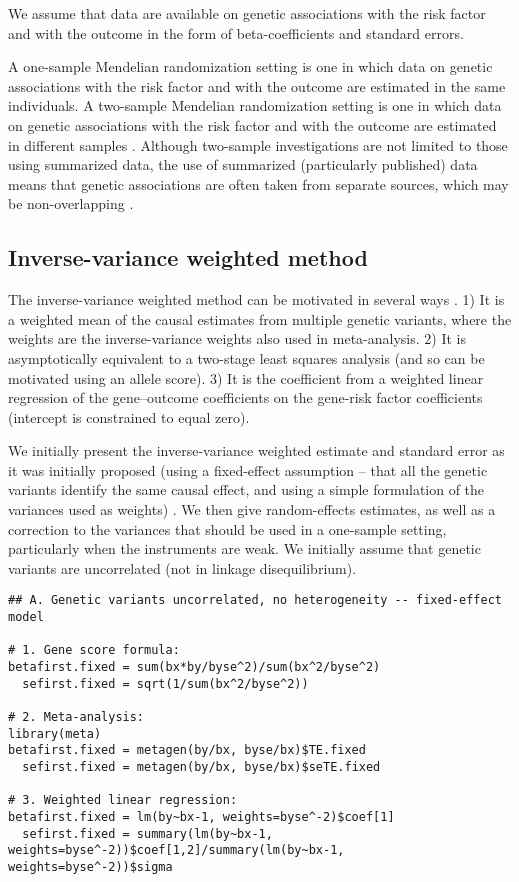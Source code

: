 \documentclass[a4paper,12pt]{article} %
\begin{document}
We assume that data are available on genetic associations with the risk factor and with the outcome in the form of beta-coefficients and standard errors.

A one-sample Mendelian randomization setting is one in which data on genetic associations with the risk factor and with the outcome are estimated in the same individuals. A two-sample Mendelian randomization setting is one in which data on genetic associations with the risk factor and with the outcome are estimated in different samples \citep{pierce2013}. Although two-sample investigations are not limited to those using summarized data, the use of summarized (particularly published) data means that genetic associations are often taken from separate sources, which may be non-overlapping \citep{burgess2014twosample}.

\clearpage

\subsection{Inverse-variance weighted method}
The inverse-variance weighted method can be motivated in several ways \citep{burgess2013genepi}. 1) It is a weighted mean of the causal estimates from multiple genetic variants, where the weights are the inverse-variance weights also used in meta-analysis. 2) It is asymptotically equivalent to a two-stage least squares analysis (and so can be motivated using an allele score). 3) It is the coefficient from a weighted linear regression of the gene--outcome coefficients on the gene-risk factor coefficients (intercept is constrained to equal zero).

We initially present the inverse-variance weighted estimate and standard error as it was initially proposed (using a fixed-effect assumption -- that all the genetic variants identify the same causal effect, and using a simple formulation of the variances used as weights) . We then give random-effects estimates, as well as a correction to the variances that should be used in a one-sample setting, particularly when the instruments are weak. We initially assume that genetic variants are uncorrelated (not in linkage disequilibrium).

\begin{lstlisting}
## A. Genetic variants uncorrelated, no heterogeneity -- fixed-effect model

# 1. Gene score formula:
betafirst.fixed = sum(bx*by/byse^2)/sum(bx^2/byse^2)
  sefirst.fixed = sqrt(1/sum(bx^2/byse^2))

# 2. Meta-analysis:
library(meta)
betafirst.fixed = metagen(by/bx, byse/bx)$TE.fixed
  sefirst.fixed = metagen(by/bx, byse/bx)$seTE.fixed

# 3. Weighted linear regression:
betafirst.fixed = lm(by~bx-1, weights=byse^-2)$coef[1]
  sefirst.fixed = summary(lm(by~bx-1, weights=byse^-2))$coef[1,2]/summary(lm(by~bx-1, weights=byse^-2))$sigma
\end{lstlisting}
\end{document}
